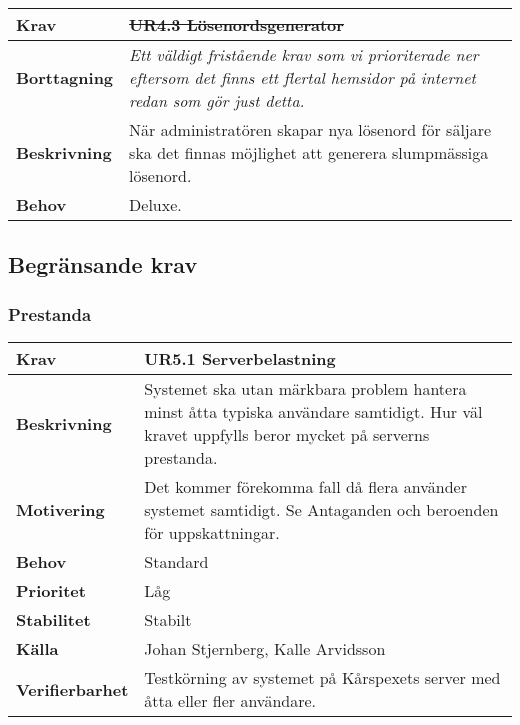 \documentclass[a4paper, twoside, 11pt, titlepage]{article}
\begin{document}
		\begin {table} [ht] \begin{tabular} { p{2.6cm} p{12.5cm} }
			\hline
			{\sffamily\textbf{Krav}} & {\sffamily\textbf{\sout{UR4.3 Lösenordsgenerator}}} \\
			\hline
			{\sffamily\textbf{Borttagning}} & {\emph{Ett väldigt fristående krav som vi prioriterade ner eftersom det finns ett flertal hemsidor på internet redan som gör just detta.}} \\
			\hline
			{\sffamily\textbf{Beskrivning}} & {När administratören skapar nya lösenord för säljare ska det finnas möjlighet att generera slumpmässiga lösenord.} \\
			\hline
			{\sffamily\textbf{Behov}} & {Deluxe.} \\
			\hline
		\end{tabular} \end{table} \FloatBarrier


	\subsection{Begränsande krav}



		\subsubsection{Prestanda}


		\begin {table} [ht] \begin{tabular} { p{2.6cm} p{12.5cm} }
			\hline
			{\sffamily\textbf{Krav}} & {\sffamily\textbf{UR5.1 Serverbelastning}} \\
			\hline
			{\sffamily\textbf{Beskrivning}} & {Systemet ska utan märkbara problem hantera minst åtta typiska användare samtidigt. Hur väl kravet uppfylls beror mycket på serverns prestanda.} \\
			\hline
			{\sffamily\textbf{Motivering}} & {Det kommer förekomma fall då flera använder systemet samtidigt. Se Antaganden och beroenden för uppskattningar.} \\
			\hline
			{\sffamily\textbf{Behov}} & {Standard} \\
			\hline
			{\sffamily\textbf{Prioritet}} & {Låg} \\
			\hline
			{\sffamily\textbf{Stabilitet}} & {Stabilt} \\
			\hline
			{\sffamily\textbf{Källa}} & {Johan Stjernberg, Kalle Arvidsson} \\
			\hline
			{\sffamily\textbf{Verifierbarhet}} & {Testkörning av systemet på Kårspexets server med åtta eller fler användare.} \\
			\hline
		\end{tabular} \end{table} \FloatBarrier
		\vspace{6mm}
\end{document}
